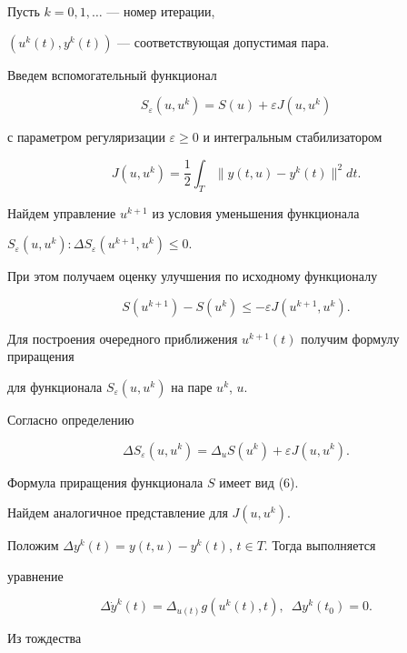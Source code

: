 Пусть $k=0,1,\dotsc$ --- номер итерации, 


$(u^{k}(t),y^{k}(t))$ --- соответствующая допустимая пара.


Введем вспомогательный функционал


$$


S_{\varepsilon}(u,u^{k})=S(u)+\varepsilon J(u,u^{k})


$$


с параметром регуляризации $\varepsilon\geq 0$ и интегральным стабилизатором


$$


J(u,u^{k})=\frac{1}{2}\int_{T}\|y(t,u)-y^{k}(t)\|^{2}dt.


$$


Найдем управление $u^{k+1}$ из условия уменьшения функционала


$S_{\varepsilon}(u,u^{k}): \Delta S_{\varepsilon}(u^{k+1},u^{k})\leq 0$.


При этом получаем оценку улучшения по исходному функционалу


\begin{equation}


S(u^{k+1})-S(u^{k})\leq -\varepsilon J(u^{k+1},u^{k}).


\end{equation}





Для построения очередного приближения $u^{k+1}(t)$ получим формулу приращения 


для функционала $S_{\varepsilon}(u,u^{k})$ на паре $u^{k}$, $u$.


Согласно определению


$$


\Delta S_{\varepsilon}(u,u^{k})=\Delta_{u}S(u^{k})+\varepsilon J(u,u^{k}).


$$


Формула приращения функционала $S$ имеет вид (6). 


Найдем аналогичное представление для $J(u,u^{k})$.





Положим $\Delta y^{k}(t)=y(t,u)-y^{k}(t)$, $t\in T$. Тогда выполняется 


уравнение 


$$


\Delta \Dot y^{k}(t)=\Delta_{u(t)}g(u^{k}(t),t),\ \;\Delta y^{k}(t_{0})=0.


$$ 


Из тождества


